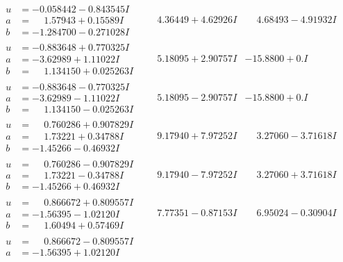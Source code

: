 \documentclass[1p]{elsarticle_modified}
\theoremstyle{definition}
\begin{document}
$$\begin{array}{c|c|c}
\begin{aligned}
u &= -0.058442 - 0.843545 I \\
a &= \phantom{-}1.57943 + 0.15589 I \\
b &= -1.284700 - 0.271028 I\end{aligned}
 & \phantom{-}4.36449 + 4.62926 I & \phantom{-}4.68493 - 4.91932 I \\ \hline\begin{aligned}
u &= -0.883648 + 0.770325 I \\
a &= -3.62989 + 1.11022 I \\
b &= \phantom{-}1.134150 + 0.025263 I\end{aligned}
 & \phantom{-}5.18095 + 2.90757 I & -15.8800 + 0. I\phantom{ +0.000000I} \\ \hline\begin{aligned}
u &= -0.883648 - 0.770325 I \\
a &= -3.62989 - 1.11022 I \\
b &= \phantom{-}1.134150 - 0.025263 I\end{aligned}
 & \phantom{-}5.18095 - 2.90757 I & -15.8800 + 0. I\phantom{ +0.000000I} \\ \hline\begin{aligned}
u &= \phantom{-}0.760286 + 0.907829 I \\
a &= \phantom{-}1.73221 + 0.34788 I \\
b &= -1.45266 - 0.46932 I\end{aligned}
 & \phantom{-}9.17940 + 7.97252 I & \phantom{-}3.27060 - 3.71618 I \\ \hline\begin{aligned}
u &= \phantom{-}0.760286 - 0.907829 I \\
a &= \phantom{-}1.73221 - 0.34788 I \\
b &= -1.45266 + 0.46932 I\end{aligned}
 & \phantom{-}9.17940 - 7.97252 I & \phantom{-}3.27060 + 3.71618 I \\ \hline\begin{aligned}
u &= \phantom{-}0.866672 + 0.809557 I \\
a &= -1.56395 - 1.02120 I \\
b &= \phantom{-}1.60494 + 0.57469 I\end{aligned}
 & \phantom{-}7.77351 - 0.87153 I & \phantom{-}6.95024 - 0.30904 I \\ \hline\begin{aligned}
u &= \phantom{-}0.866672 - 0.809557 I \\
a &= -1.56395 + 1.02120 I \\

\end{aligned}
\end{array}$$
\end{document}
